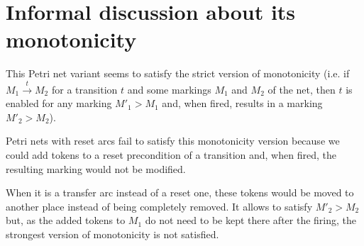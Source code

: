 \documentclass{article}
\begin{document}
\section{Informal discussion about its monotonicity}

This Petri net variant seems to satisfy the strict version of 
monotonicity (i.e. if $M_1 \stackrel{t}{\rightarrow} M_2$ for a 
transition $t$ and some markings $M_1$ and $M_2$ of the net, then
$t$ is enabled for any marking $M'_1 > M_1$ and, when fired, results 
in a  marking $M'_2 > M_2$).

Petri nets with reset arcs fail to satisfy this monotonicity version 
because we could add tokens to a reset precondition of a transition 
and, when fired, the resulting marking would not be modified.

When it is a transfer arc instead of a reset one, these tokens would 
be moved to another place instead of being completely removed. It 
allows to satisfy $M'_2 > M_2$ but, as the added tokens 
to $M_1$ do not need to be kept there after the firing, the strongest version 
of monotonicity is not satisfied.
\end{document}

